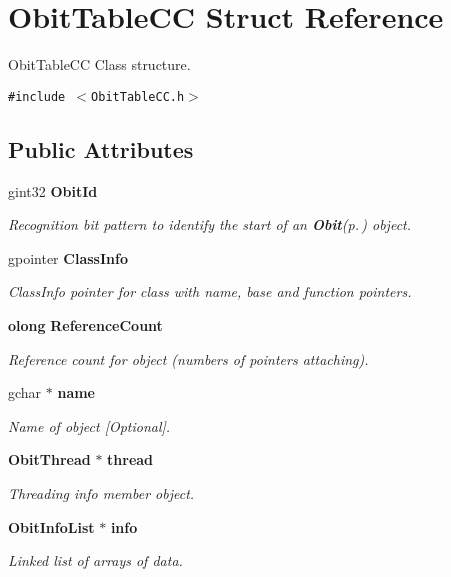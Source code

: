 \section{Obit\-Table\-CC Struct Reference}
\label{structObitTableCC}
Obit\-Table\-CC Class structure.  


{\tt \#include $<$Obit\-Table\-CC.h$>$}

\subsection*{Public Attributes}
\begin{CompactItemize}
\item 
gint32 {\bf Obit\-Id}
\begin{CompactList}\small\item\em Recognition bit pattern to identify the start of an {\bf Obit}{\rm (p.\,\pageref{structObit})} object. \item\end{CompactList}\item 
gpointer {\bf Class\-Info}
\begin{CompactList}\small\item\em Class\-Info pointer for class with name, base and function pointers. \item\end{CompactList}\item 
{\bf olong} {\bf Reference\-Count}
\begin{CompactList}\small\item\em Reference count for object (numbers of pointers attaching). \item\end{CompactList}\item 
gchar $\ast$ {\bf name}
\begin{CompactList}\small\item\em Name of object [Optional]. \item\end{CompactList}\item 
{\bf Obit\-Thread} $\ast$ {\bf thread}
\begin{CompactList}\small\item\em Threading info member object. \item\end{CompactList}\item 
{\bf Obit\-Info\-List} $\ast$ {\bf info}
\begin{CompactList}\small\item\em Linked list of arrays of data. \item\end{CompactList}\item 

\end{CompactItemize}
